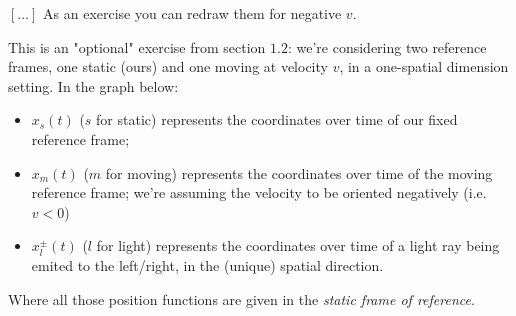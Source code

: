 \documentclass[solutions.tex]{subfiles}
\begin{document}
\maketitle
\begin{exercise}[p. $8$] $[\ldots]$ As an exercise you can redraw them for
negative $v$.
\end{exercise}

This is an "optional" exercise from section $1.2$: we're considering
two reference frames, one static (ours) and one moving at velocity $v$,
in a one-spatial dimension setting. In the graph below:
\begin{itemize}
	\item $x_s(t)$ ($s$ for static) represents the coordinates over
	time of our fixed reference frame;
	\item $x_m(t)$ ($m$ for moving) represents the coordinates over
	time of the moving reference frame; we're assuming the velocity
	to be oriented negatively (i.e. $v < 0$)
	\item $x^\pm_l(t)$ ($l$ for light) represents the coordinates over
	time of a light ray being emited to the left/right, in the (unique)
	spatial direction.
\end{itemize}

Where all those position functions are given in the \textit{static
frame of reference}.
\end{document}

